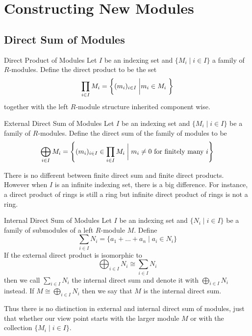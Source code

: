 \documentclass[a4paper]{article}
\begin{document}
\pagebreak
\section{Constructing New Modules}
\subsection{Direct Sum of Modules}
\begin{defn}{Direct Product of Modules}{} Let $I$ be an indexing set and $\{M_i\;|\;i\in I\}$ a family of $R$-modules. Define the direct product to be the set $$\prod_{i\in I}M_i=\left\{(m_i)_{i\in I}\;\bigg{|}m_i\in M_i\;\right\}$$ together with the left $R$-module structure inherited component wise. 
\end{defn}

\begin{defn}{External Direct Sum of Modules}{} Let $I$ be an indexing set and $\{M_i\;|\;i\in I\}$ be a family of $R$-modules. Define the direct sum of the family of modules to be $$\bigoplus_{i\in I}M_i=\left\{(m_i)_{i\in I}\in\prod_{i\in I}M_i\;\bigg{|}\;m_i\neq 0\text{ for finitely many }i\right\}$$
\end{defn}

There is no different between finite direct sum and finite direct products. However when $I$ is an infinite indexing set, there is a big difference. For instance, a direct product of rings is still a ring but infinite direct product of rings is not a ring. 

\begin{defn}{Internal Direct Sum of Modules}{} Let $I$ be an indexing set and $\{N_i\;|\;i\in I\}$ be a family of submodules of a left $R$-module $M$. Define $$\sum_{i\in I}N_i=\{a_1+\dots+a_n\;|\;a_i\in N_i\}$$ If the external direct product is isomorphic to $$\bigoplus_{i\in I}N_i\cong\sum_{i\in I}N_i$$ then we call $\sum_{i\in I}N_i$ the internal direct sum and denote it with $\bigoplus_{i\in I}N_i$ instead. If $M\cong\bigoplus_{i\in I}N_i$ then we say that $M$ is the internal direct sum. 
\end{defn}

Thus there is no distinction in external and internal direct sum of modules, just that whether our view point starts with the larger module $M$ or with the collection $\{M_i\;|\;i\in I\}$. 
\end{document}
